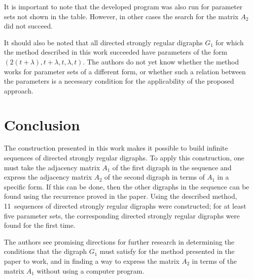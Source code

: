 \documentclass{article}
\begin{document}
It is important to note that the developed program was also run for parameter sets not shown in the table. However, in other cases the search for the matrix $A_2$ did not succeed.

It should also be noted that all directed strongly regular digraphs $G_1$ for which the method described in this work succeeded have parameters of the form $(2(t+\lambda), t+\lambda, t, \lambda, t)$. The authors do not yet know whether the method works for parameter sets of a different form, or whether such a relation between the parameters is a necessary condition for the applicability of the proposed approach.

\section{Conclusion}

The construction presented in this work makes it possible to build infinite sequences of directed strongly regular digraphs. To apply this construction, one must take the adjacency matrix $A_1$ of the first digraph in the sequence and express the adjacency matrix $A_2$ of the second digraph in terms of $A_1$ in a specific form. If this can be done, then the other digraphs in the sequence can be found using the recurrence proved in the paper. Using the described method, 11~sequences of directed strongly regular digraphs were constructed; for at least five parameter sets, the corresponding directed strongly regular digraphs were found for the first time.

The authors see promising directions for further research in determining the conditions that the digraph $G_1$ must satisfy for the method presented in the paper to work, and in finding a way to express the matrix $A_2$ in terms of the matrix $A_1$ without using a computer program.


\end{document}
